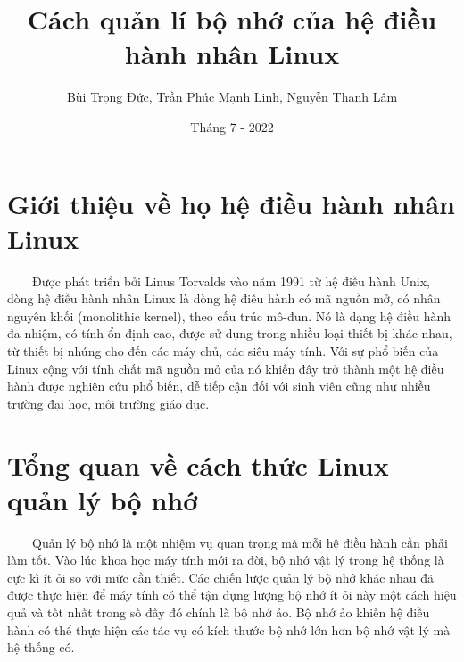 \documentclass{article}
\date{Tháng 7 - 2022}
\title{\textbf{Cách quản lí bộ nhớ của hệ điều hành nhân Linux}}
\author{Bùi Trọng Đức, Trần Phúc Mạnh Linh, Nguyễn Thanh Lâm}
\begin{document}
\maketitle
\section{Giới thiệu về họ hệ điều hành nhân Linux}
~~~~Được phát triển bởi Linus Torvalds vào năm 1991 từ hệ điều hành Unix, dòng hệ điều hành nhân Linux là dòng hệ điều hành có mã nguồn mở, có nhân nguyên khối (monolithic kernel), theo cấu trúc mô-đun. Nó là dạng hệ điều hành đa nhiệm, có tính ổn định cao, được sử dụng trong nhiều loại thiết bị khác nhau, từ thiết bị nhúng cho đến các máy chủ, các siêu máy tính. Với sự phổ biến của Linux cộng với tính chất mã nguồn mở của nó khiến đây trở thành một hệ điều hành được nghiên cứu phổ biến, dễ tiếp cận đối với sinh viên cũng như nhiều trường đại học, môi trường giáo dục.
\section{Tổng quan về cách thức Linux quản lý bộ nhớ}
~~~~Quản lý bộ nhớ là một nhiệm vụ quan trọng mà mỗi hệ điều hành cần phải làm tốt. Vào lúc khoa học máy tính mới ra đời, bộ nhớ vật lý trong hệ thống là cực kì ít ỏi so với mức cần thiết. Các chiến lược quản lý bộ nhớ khác nhau đã được thực hiện để máy tính có thể tận dụng lượng bộ nhớ ít ỏi này một cách hiệu quả và tốt nhất trong số đấy đó chính là bộ nhớ ảo. Bộ nhớ ảo khiến hệ điều hành có thể thực hiện các tác vụ có kích thước bộ nhớ lớn hơn bộ nhớ vật lý mà hệ thống có.\vspace{1em}
\end{document}
